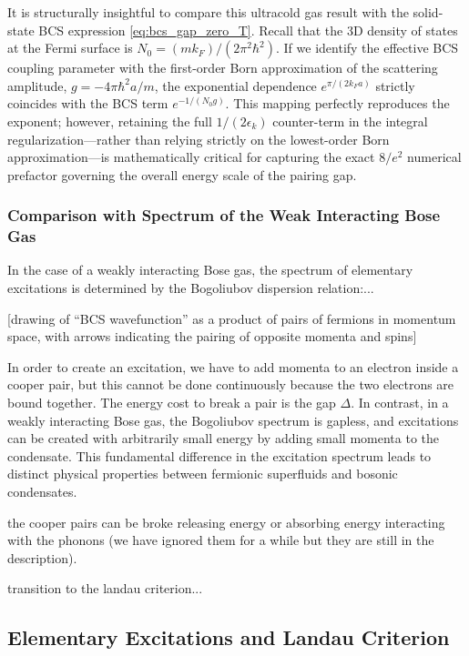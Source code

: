 It is structurally insightful to compare this ultracold gas result with the solid-state BCS expression \eqref{eq:bcs_gap_zero_T}. Recall that the 3D density of states at the Fermi surface is \( N_0 = (m k_F)/(2\pi^2\hbar^2) \). If we identify the effective BCS coupling parameter with the first-order Born approximation of the scattering amplitude, \( g = -4\pi\hbar^2 a / m \), the exponential dependence \( e^{\pi/(2 k_F a)} \) strictly coincides with the BCS term \( e^{-1/(N_0 g)} \). This mapping perfectly reproduces the exponent; however, retaining the full \( 1/(2\epsilon_k) \) counter-term in the integral regularization—rather than relying strictly on the lowest-order Born approximation—is mathematically critical for capturing the exact \( 8/e^2 \) numerical prefactor governing the overall energy scale of the pairing gap.

\subsubsection{Comparison with Spectrum of the Weak Interacting Bose Gas}

In the case of a weakly interacting Bose gas, the spectrum of elementary excitations is determined by the Bogoliubov dispersion relation:...

[drawing of ``BCS wavefunction'' as a product of pairs of fermions in momentum space, with arrows indicating the pairing of opposite momenta and spins]

In order to create an excitation, we have to add momenta to an electron inside a cooper pair, but this cannot be done continuously because the two electrons are bound together. The energy cost to break a pair is the gap \( \Delta \). In contrast, in a weakly interacting Bose gas, the Bogoliubov spectrum is gapless, and excitations can be created with arbitrarily small energy by adding small momenta to the condensate. This fundamental difference in the excitation spectrum leads to distinct physical properties between fermionic superfluids and bosonic condensates.

the cooper pairs can be broke releasing energy or absorbing energy interacting with the phonons (we have ignored them for a while but they are still in the description).

transition to the landau criterion...

\subsection{Elementary Excitations and Landau Criterion}


